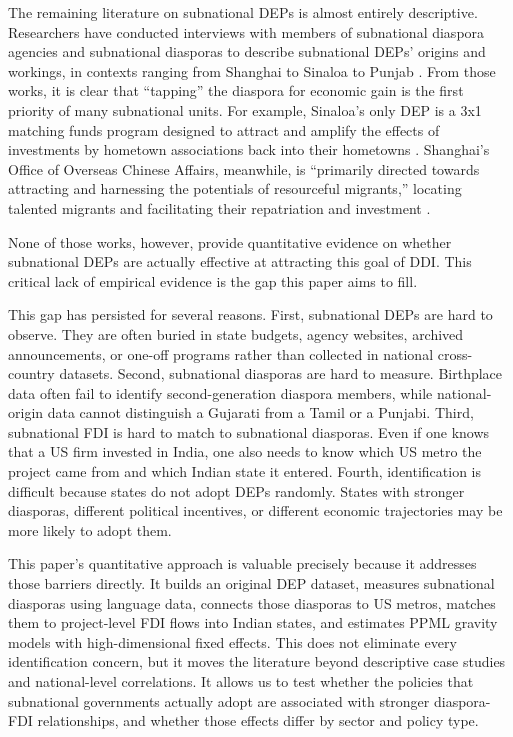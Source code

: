 \documentclass[doublespace,nopageskip]{UVAthesis}
\begin{document}
The remaining literature on subnational DEPs is almost entirely descriptive. Researchers have conducted interviews with members of subnational diaspora agencies and subnational diasporas to describe subnational DEPs' origins and workings, in contexts ranging from Shanghai to Sinaloa to Punjab \citep{hasic_diaspora-management_2020, rivera_indifferent_2019, thandi_punjab_2014}. From those works, it is clear that ``tapping'' the diaspora for economic gain is the first priority of many subnational units. For example, Sinaloa's only DEP is a 3x1 matching funds program designed to attract and amplify the effects of investments by hometown associations back into their hometowns \citep{rivera_indifferent_2019}. Shanghai's Office of Overseas Chinese Affairs, meanwhile, is ``primarily directed towards attracting and harnessing the potentials of resourceful migrants,'' locating talented migrants and facilitating their repatriation and investment \citep{hasic_diaspora-management_2020}.

None of those works, however, provide quantitative evidence on whether subnational DEPs are actually effective at attracting this goal of DDI. This critical lack of empirical evidence is the gap this paper aims to fill.

This gap has persisted for several reasons. First, subnational DEPs are hard to observe. They are often buried in state budgets, agency websites, archived announcements, or one-off programs rather than collected in national cross-country datasets. Second, subnational diasporas are hard to measure. Birthplace data often fail to identify second-generation diaspora members, while national-origin data cannot distinguish a Gujarati from a Tamil or a Punjabi. Third, subnational FDI is hard to match to subnational diasporas. Even if one knows that a US firm invested in India, one also needs to know which US metro the project came from and which Indian state it entered. Fourth, identification is difficult because states do not adopt DEPs randomly. States with stronger diasporas, different political incentives, or different economic trajectories may be more likely to adopt them.

This paper's quantitative approach is valuable precisely because it addresses those barriers directly. It builds an original DEP dataset, measures subnational diasporas using language data, connects those diasporas to US metros, matches them to project-level FDI flows into Indian states, and estimates PPML gravity models with high-dimensional fixed effects. This does not eliminate every identification concern, but it moves the literature beyond descriptive case studies and national-level correlations. It allows us to test whether the policies that subnational governments actually adopt are associated with stronger diaspora-FDI relationships, and whether those effects differ by sector and policy type.
\end{document}
